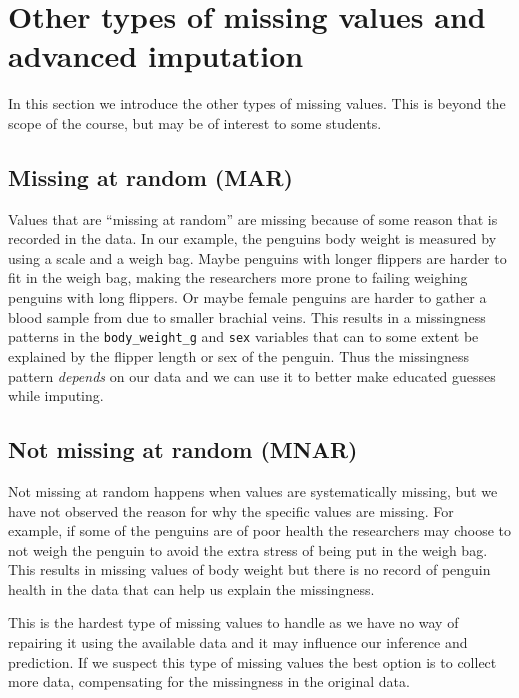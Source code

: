 \documentclass[
  letterpaper,
  DIV=11,
  numbers=noendperiod]{scrreprt}
\begin{document}
\section{Other types of missing values and advanced
imputation}\label{other-types-of-missing-values-and-advanced-imputation}

In this section we introduce the other types of missing values. This is
beyond the scope of the course, but may be of interest to some students.

\subsection{Missing at random (MAR)}\label{missing-at-random-mar}

Values that are ``missing at random'' are missing because of some reason
that is recorded in the data. In our example, the penguins body weight
is measured by using a scale and a weigh bag. Maybe penguins with longer
flippers are harder to fit in the weigh bag, making the researchers more
prone to failing weighing penguins with long flippers. Or maybe female
penguins are harder to gather a blood sample from due to smaller
brachial veins. This results in a missingness patterns in the
\texttt{body\_weight\_g} and \texttt{sex} variables that can to some
extent be explained by the flipper length or sex of the penguin. Thus
the missingness pattern \emph{depends} on our data and we can use it to
better make educated guesses while imputing.

\subsection{Not missing at random
(MNAR)}\label{not-missing-at-random-mnar}

Not missing at random happens when values are systematically missing,
but we have not observed the reason for why the specific values are
missing. For example, if some of the penguins are of poor health the
researchers may choose to not weigh the penguin to avoid the extra
stress of being put in the weigh bag. This results in missing values of
body weight but there is no record of penguin health in the data that
can help us explain the missingness.

This is the hardest type of missing values to handle as we have no way
of repairing it using the available data and it may influence our
inference and prediction. If we suspect this type of missing values the
best option is to collect more data, compensating for the missingness in
the original data.
\end{document}

